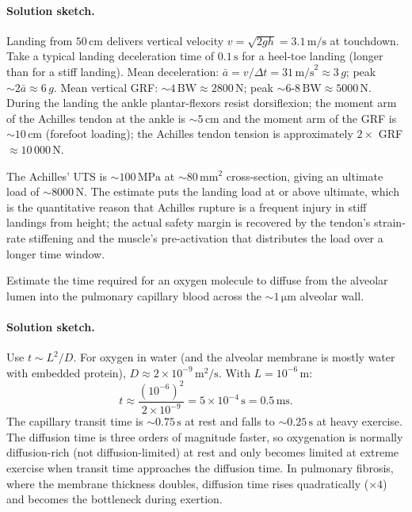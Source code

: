 \paragraph{Solution sketch.}
Landing from $50\,\text{cm}$ delivers vertical velocity
$v = \sqrt{2 g h} = 3.1\,\text{m/s}$ at touchdown. Take a typical
landing deceleration time of $0.1\,\text{s}$ for a heel-toe
landing (longer than for a stiff landing). Mean deceleration:
$\bar a = v/\Delta t = 31\,\text{m/s}^2 \approx 3\,g$; peak
$\sim 2\bar a \approx 6\,g$. Mean vertical GRF: $\sim 4\,\text{BW}
\approx 2800\,\text{N}$; peak $\sim 6\text{-}8\,\text{BW} \approx
5000\,\text{N}$. During the landing the ankle plantar-flexors
resist dorsiflexion; the moment arm of the Achilles tendon at the
ankle is $\sim 5\,\text{cm}$ and the moment arm of the GRF is
$\sim 10\,\text{cm}$ (forefoot loading); the Achilles tendon
tension is approximately $2 \times$ GRF $\approx 10\,000\,\text{N}$.

The Achilles' UTS is $\sim 100\,\text{MPa}$ at $\sim 80\,\text{mm}^2$
cross-section, giving an ultimate load of $\sim 8000\,\text{N}$. The
estimate puts the landing load at or above ultimate, which is the
quantitative reason that Achilles rupture is a frequent injury in
stiff landings from height; the actual safety margin is recovered by
the tendon's strain-rate stiffening and the muscle's pre-activation
that distributes the load over a longer time window.

\begin{exercise}
Estimate the time required for an oxygen molecule to diffuse from
the alveolar lumen into the pulmonary capillary blood across the
$\sim 1\,\si{\micro\meter}$ alveolar wall.
\end{exercise}

\paragraph{Solution sketch.}
Use $t \sim L^2/D$. For oxygen in water (and the alveolar membrane
is mostly water with embedded protein), $D \approx 2\times 10^{-9}\,\text{m}^2/\text{s}$.
With $L = 10^{-6}\,\text{m}$:
\[
t \approx \frac{(10^{-6})^2}{2 \times 10^{-9}} = 5 \times 10^{-4}\,\text{s} = 0.5\,\text{ms}.
\]
The capillary transit time is $\sim 0.75\,\text{s}$ at rest and falls
to $\sim 0.25\,\text{s}$ at heavy exercise. The diffusion time is
three orders of magnitude faster, so oxygenation is normally
diffusion-rich (not diffusion-limited) at rest and only becomes
limited at extreme exercise when transit time approaches the
diffusion time. In pulmonary fibrosis, where the membrane thickness
doubles, diffusion time rises quadratically ($\times 4$) and
becomes the bottleneck during exertion.

